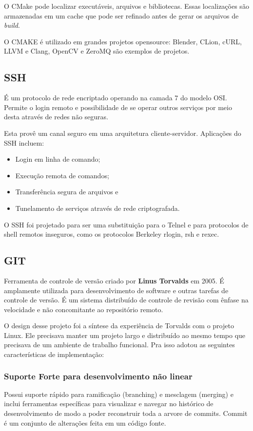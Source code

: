 \documentclass[
	article,			%
	12pt,				%
	oneside,			%
	a4paper,			%
	english,			
	brazil,
	sumario=tradicional
	]{abntex2}
\begin{document}
O CMake pode localizar executáveis, arquivos e bibliotecas. Essas localizações são armazenadas em um cache que pode ser refinado antes de gerar os arquivos de \textit{build}.

O CMAKE é utilizado em grandes projetos opensource: Blender, CLion, cURL, LLVM e Clang, OpenCV e ZeroMQ são exemplos de projetos.

\pagebreak
\subsection{SSH}
É um protocolo de rede encriptado operando na camada 7 do modelo OSI. Permite o login remoto e possibilidade de se operar outros serviços por meio desta através de redes não seguras.

Esta provê um canal seguro em uma arquitetura cliente-servidor. Aplicações do SSH incluem:

\begin{itemize}
	\item{Login em linha de comando;}
	\item{Execução remota de comandos;}
	\item{Transferência segura de arquivos e}
	\item{Tunelamento de serviços através de rede criptografada.}
\end{itemize}

O SSH foi projetado para ser uma substituição para o Telnel e para protocolos de shell remotos inseguros, como os protocolos Berkeley rlogin, rsh e rexec.

\pagebreak
\subsection{GIT}

Ferramenta de controle de versão criado por \textbf{Linus Torvalds} em 2005. É amplamente utilizada para desenvolvimento de software e outras tarefas de controle de versão. É um sistema distribuído de controle de revisão com ênfase na velocidade e não concomitante ao repositório remoto. 

O design desse projeto foi a síntese da experiência de Torvalds com o projeto Linux. Ele precisava manter um projeto largo e distribuído ao mesmo tempo que precisava de um ambiente de trabalho funcional. Pra isso adotou as seguintes características de implementação:

\subsubsection{Suporte Forte para desenvolvimento não linear}
Possui suporte rápido para ramificação (branching) e mesclagem (merging) e inclui ferramentas específicas para visualizar e navegar no histórico de desenvolvimento de modo a poder reconstruir toda a arvore de commits. Commit é um conjunto de alterações feita em um código fonte.
\end{document}
